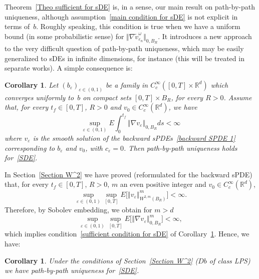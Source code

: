\documentclass[a4paper,10pt]{article}
\newtheorem{corollary}[theorem]{Corollary}
\newcommand\1{\mathbbm{1}}
\newcommand{\eps}{\varepsilon}
\numberwithin{equation}{section}
\begin{document}
Theorem~\ref{Theo sufficient for sDE} is, in a sense, our main result on path-by-path uniqueness, although assumption~\eqref{main condition for sDE} is not explicit in terms of~$b$. Roughly speaking, this condition is true when we have a uniform bound (in some probabilistic sense) for $\Vert \nabla\widetilde{v}_{\eps_{n}}^\omega \Vert_{0,B_R}$. It introduces a new approach to the very difficult question of path-by-path uniqueness, which may be easily generalized to sDEs in infinite dimensions, for instance (this will be treated in separate works). A simple consequence is:

\begin{corollary}
\label{Coroll sufficient for sDE}
Let $(b_{\eps})_{\eps\in(0,1)}$ be a family in $C_{c}^{\infty}([0,T] \times\mathbb{R}^{d})$ which converges uniformly to~$b$ on compact sets $[0,T]  \times B_{R}$,
for every $R>0$. Assume that, for every $t_{f}\in [0,T]  $, $R>0$ and $v_{0}\in C_{c}^{\infty}(\mathbb{R}^{d})$, we have
\begin{equation}
\sup_{\eps\in(  0,1)  }E\int_{0}^{t_{f}}\left\Vert \nabla
v_{\eps}\right\Vert _{0,B_R}ds<\infty \label{sufficient condition for sDE}
\end{equation}
where $v_{\eps}$ is the smooth solution of the backward sPDEs~\eqref{backward SPDE 1} corresponding to $b_{\eps}$ and $v_{0}$, with $c_{\eps}=0$. Then path-by-path uniqueness holds for~\eqref{SDE}.
\end{corollary}

In Section~\ref{Section W^2} we have proved (reformulated for the backward sPDE) that, for every $t_{f}\in [0,T]  $, $R>0$, $m$ an even positive integer and $v_{0}\in C_{c}^{\infty}(\mathbb{R}^{d})$,
\begin{equation*}
\sup_{\eps\in (0,1)  }\sup_{[0,T]  }E \Big[\left\Vert v_{\eps}\right\Vert _{W^{2,m}( B_{R})} 
^{m}\Big]  <\infty .
\end{equation*}
Therefore, by Sobolev embedding, we obtain for $m >d$ 
\begin{equation}
\sup_{\eps\in (0,1)}\sup_{[0,T]  }E \Big[ \left\Vert \nabla v_{\eps}\right\Vert _{0,B_R}^{m}\Big]  <\infty, \label{uniform estimate grad u} 
\end{equation}
which implies condition~\eqref{sufficient condition for sDE} of Corollary~\ref{Coroll sufficient for sDE}. Hence, we have:

\begin{corollary}
Under the conditions of Section~\ref{Section W^2} \textup{(}$Db$ of class LPS\textup{)} we have path-by-path uniqueness for~\eqref{SDE}.
\end{corollary}
\end{document}
